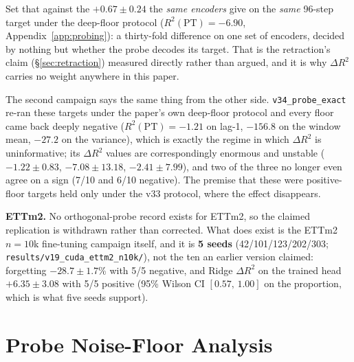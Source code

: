 Set that against the $+0.67{\pm}0.24$ the \emph{same encoders} give on the
\emph{same} 96-step target under the deep-floor protocol
($R^2(\text{PT}){=}{-}6.90$, Appendix~\ref{app:probing}): a thirty-fold
difference on one set of encoders, decided by nothing but whether the probe
decodes its target.  That is the retraction's claim (\S\ref{sec:retraction})
measured directly rather than argued, and it is why $\Delta R^2$ carries no
weight anywhere in this paper.

The second campaign says the same thing from the other side.
\texttt{v34\_probe\_exact} re-ran these targets under the paper's own
deep-floor protocol and every floor came back deeply negative
($R^2(\text{PT}){=}{-}1.21$ on lag-1, $-156.8$ on the window mean, $-27.2$ on the
variance), which is exactly the regime in which $\Delta R^2$ is uninformative;
its $\Delta R^2$ values are correspondingly enormous and unstable
($-1.22{\pm}0.83$, $-7.08{\pm}13.18$, $-2.41{\pm}7.99$), and two of the three no
longer even agree on a sign (7/10 and 6/10 negative).  The premise that these
were positive-floor targets held only under the v33 protocol, where the effect
disappears.

\textbf{ETTm2.}  No orthogonal-probe record exists for ETTm2, so the claimed
replication is withdrawn rather than corrected.  What does exist is the ETTm2
$n{=}10$k fine-tuning campaign itself, and it is \textbf{5 seeds}
(42/101/123/202/303; \texttt{results/v19\_cuda\_ettm2\_n10k/}), not the ten an
earlier version claimed: forgetting $-28.7{\pm}1.7$\% with 5/5 negative, and
Ridge $\Delta R^2$ on the trained head $+6.35{\pm}3.08$ with 5/5 positive
(95\% Wilson CI $[0.57,\,1.00]$ on the proportion, which is what five seeds
support).

\section{Probe Noise-Floor Analysis}
\label{app:noisefloor}

\noindent{}
\vspace{1em}

